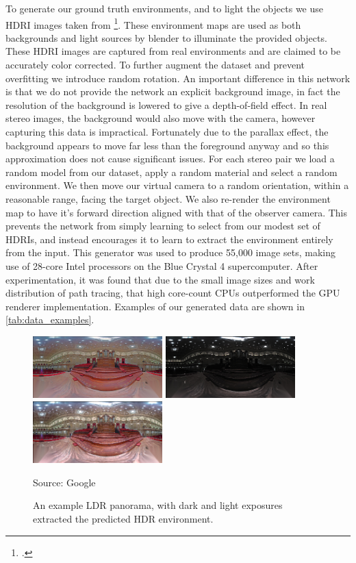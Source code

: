 \documentclass[ %
                    author={Gavin Parker},
                supervisor={Dr. Neill Campbell},
                    degree={MEng},
                     title={Deep Learning for Illumination Estimation from Stereo Images},
                  subtitle={},
                      type={Research},
                      year={2018} ]{dissertation}
\begin{document}
\newline
To generate our ground truth environments, and to light the objects we use HDRI images taken from \footcite{https://hdrihaven.com/}. These environment maps are used as both backgrounds and light sources by blender to illuminate the provided objects. These HDRI images are captured from real environments and are claimed to be accurately color corrected. To further augment the dataset and prevent overfitting we introduce random rotation. An important difference in this network is that we do not provide the network an explicit background image, in fact the resolution of the background is lowered to give a depth-of-field effect. In real stereo images, the background would also move with the camera, however capturing this data is impractical. Fortunately due to the parallax effect, the background appears to move far less than the foreground anyway and so this approximation does not cause significant issues. For each stereo pair we load a random model from our dataset, apply a random material and select a random environment. We then move our virtual camera to a random orientation, within a reasonable range, facing the target object. We also re-render the environment map to have it's forward direction aligned with that of the observer camera. This prevents the network from simply learning to select from our modest set of HDRIs, and instead encourages it to learn to extract the environment entirely from the input. This generator was used to produce 55,000 image sets, making use of 28-core Intel processors on the Blue Crystal 4 supercomputer. After experimentation, it was found that due to the small image sizes and work distribution of path tracing, that high core-count CPUs outperformed the GPU renderer implementation. Examples of our generated data are shown in \ref{tab:data_examples}.
\begin{figure}
\center
\includegraphics[width=5cm]{images/google_example/original}
\includegraphics[width=5cm]{images/google_example/dark}
\includegraphics[width=5cm]{images/google_example/bright}
\caption{An example LDR panorama, with dark and light exposures extracted the predicted HDR environment.}\label{fig:google}
Source: Google
\end{figure}
\end{document}

